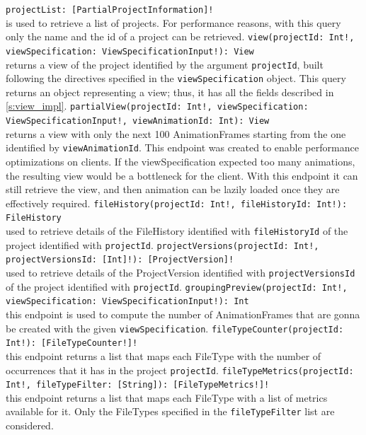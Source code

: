 \texttt{projectList:  [PartialProjectInformation]!} \\ 
is used to retrieve a list of projects. For performance reasons, with this query only the name and the id of a project can be retrieved. 
\bigbreak
\texttt{view(projectId: Int!, viewSpecification: ViewSpecificationInput!): View} \\
returns a view of the project identified by the argument \texttt{projectId}, built following the directives specified in the \texttt{viewSpecification} object. 
This query returns an object representing a view; thus, it has all the fields described in \autoref{s:view_impl}. 
\bigbreak
\texttt{partialView(projectId: Int!, viewSpecification: ViewSpecificationInput!, viewAnimationId: Int): View} \\
returns a view with only the next 100 AnimationFrames starting from the one identified by \texttt{viewAnimationId}. 
This endpoint was created to enable performance optimizations on clients. If the viewSpecification expected too many animations, the resulting view would be a bottleneck for the client.
With this endpoint it can still retrieve the view, and then animation can be lazily loaded once they are effectively required. 
\bigbreak
\texttt{fileHistory(projectId: Int!, fileHistoryId: Int!): FileHistory} \\
used to retrieve details of the FileHistory identified with \texttt{fileHistoryId} of the project identified with \texttt{projectId}.
\bigbreak
\texttt{projectVersions(projectId: Int!, projectVersionsId: [Int]!): [ProjectVersion]!} \\
used to retrieve details of the ProjectVersion identified with \texttt{projectVersionsId} of the project identified with \texttt{projectId}.
\bigbreak
\texttt{groupingPreview(projectId: Int!, viewSpecification: ViewSpecificationInput!): Int} \\
this endpoint is used to compute the number of AnimationFrames that are gonna be created with the given \texttt{viewSpecification}.
\bigbreak
\texttt{fileTypeCounter(projectId: Int!): [FileTypeCounter!]!} \\
this endpoint returns a list that maps each FileType with the number of occurrences that it has in the project \texttt{projectId}.
\bigbreak
\texttt{fileTypeMetrics(projectId: Int!, fileTypeFilter: [String]): [FileTypeMetrics!]!} \\
this endpoint returns a list that maps each FileType with a list of metrics available for it. Only the FileTypes specified in the \texttt{fileTypeFilter} list are considered. 



